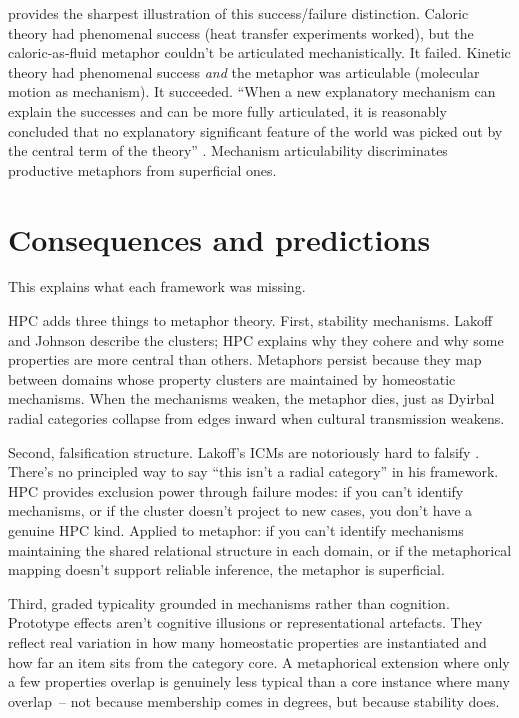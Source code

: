 \documentclass[12pt]{article}
\begin{document}
\textcite{cummiskey1992} provides the sharpest illustration of this success/failure distinction. Caloric theory had phenomenal success (heat transfer experiments worked), but the caloric-as-fluid metaphor couldn't be articulated mechanistically. It failed. Kinetic theory had phenomenal success \emph{and} the metaphor was articulable (molecular motion as mechanism). It succeeded. \enquote{When a new explanatory mechanism can explain the successes and can be more fully articulated, it is reasonably concluded that no explanatory significant feature of the world was picked out by the central term of the theory} \citep[35]{cummiskey1992}. Mechanism articulability discriminates productive metaphors from superficial ones.

\section{Consequences and predictions}
\label{sec:consequences}

This explains what each framework was missing.

HPC adds three things to metaphor theory. First, stability mechanisms. Lakoff and Johnson describe the clusters; HPC explains why they cohere and why some properties are more central than others. Metaphors persist because they map between domains whose property clusters are maintained by homeostatic mechanisms. When the mechanisms weaken, the metaphor dies, just as Dyirbal radial categories collapse from edges inward when cultural transmission weakens.

Second, falsification structure. Lakoff's ICMs are notoriously hard to falsify \citep{glynn2010}. There's no principled way to say \enquote{this isn't a radial category} in his framework. HPC provides exclusion power through failure modes: if you can't identify mechanisms, or if the cluster doesn't project to new cases, you don't have a genuine HPC kind. Applied to metaphor: if you can't identify mechanisms maintaining the shared relational structure in each domain, or if the metaphorical mapping doesn't support reliable inference, the metaphor is superficial.

Third, graded typicality grounded in mechanisms rather than cognition. Prototype effects aren't cognitive illusions or representational artefacts. They reflect real variation in how many homeostatic properties are instantiated and how far an item sits from the category core. A metaphorical extension where only a few properties overlap is genuinely less typical than a core instance where many overlap~-- not because membership comes in degrees, but because stability does.
\end{document}
